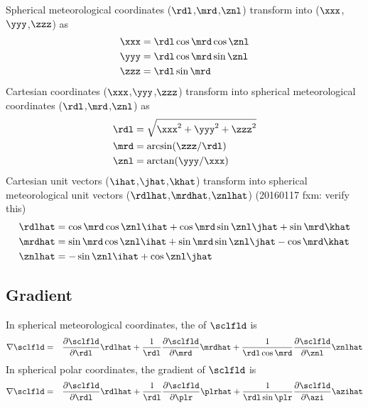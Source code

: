 \documentclass[12pt,twoside]{book}
\begin{document}
Spherical meteorological coordinates ($\rdl$,$\mrd$,$\znl$) transform into
 ($\xxx$,$\yyy$,$\zzz$) as
\begin{subequations}
\begin{align}
\xxx & = \rdl\cos\mrd\cos\znl \\
\yyy & = \rdl\cos\mrd\sin\znl \\
\zzz & = \rdl\sin\mrd
\label{eqn:mtr_crt_trn}
\end{align}
\end{subequations}
Cartesian coordinates ($\xxx$,$\yyy$,$\zzz$) transform into
spherical meteorological coordinates ($\rdl$,$\mrd$,$\znl$) as
\begin{subequations}
\begin{align}
\rdl & = \sqrt{\xxx^{2}+\yyy^{2}+\zzz^{2}} \\
\mrd & = \arcsin(\zzz/\rdl) \\
\znl & = \arctan(\yyy/\xxx)
\label{eqn:crt_sph_trn}
\end{align}
\end{subequations}
Cartesian unit vectors ($\ihat$,$\jhat$,$\khat$) transform into
spherical meteorological unit vectors ($\rdlhat$,$\mrdhat$,$\znlhat$)
(20160117 fxm: verify this)
\begin{subequations}
\begin{align}
\rdlhat & = \cos\mrd\cos\znl\ihat + \cos\mrd\sin\znl\jhat + \sin\mrd\khat \\
\mrdhat & = \sin\mrd\cos\znl\ihat + \sin\mrd\sin\znl\jhat - \cos\mrd\khat \\
\znlhat & = -\sin\znl\ihat + \cos\znl\jhat
\label{eqn:crt_mtr_unit_vct_trn}
\end{align}
\end{subequations}

\subsection[Gradient]{Gradient}\label{sxn:grd_sph}
In spherical meteorological coordinates, the  of $\sclfld$ is 
\begin{eqnarray}
\nabla \sclfld & = & 
\frac{\partial \sclfld}{\partial \rdl} \rdlhat + 
\frac{1}{\rdl} \frac{\partial \sclfld}{\partial \mrd} \mrdhat + 
\frac{1}{\rdl \cos \mrd} \frac{\partial \sclfld}{\partial \znl} \znlhat
\label{eqn:grd_sph_mtr}
\end{eqnarray}
In spherical polar coordinates, the gradient of $\sclfld$ is 
\begin{eqnarray}
\nabla \sclfld & = & 
\frac{\partial \sclfld}{\partial \rdl} \rdlhat + 
\frac{1}{\rdl} \frac{\partial \sclfld}{\partial \plr} \plrhat + 
\frac{1}{\rdl \sin \plr} \frac{\partial \sclfld}{\partial \azi} \azihat
\label{eqn:grd_sph_plr}
\end{eqnarray}
\end{document}
